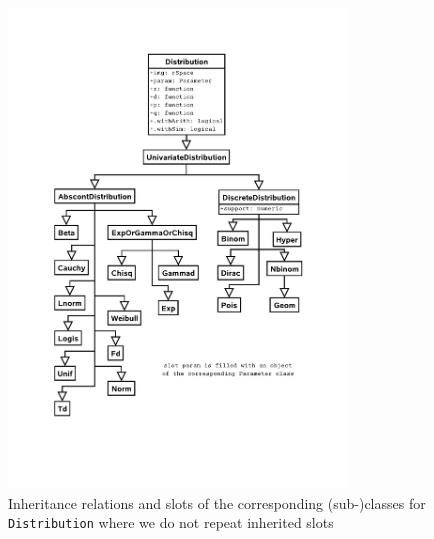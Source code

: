 \documentclass[11pt]{article}
\newcommand{\code}[1]{{\tt #1}}
\begin{document}
\ifpdf
\begin{figure}[!ht]\label{fig1}
\vspace{2ex}
  \begin{center}
    \includegraphics[viewport=130 150 500 750,width=9cm]{distribution.pdf}%
    \caption{\label{fig1c}{\footnotesize Inheritance relations and slots of the
    corresponding \mbox{(sub-)}classes for \code{Distribution} where we do not
    repeat inherited slots
    }}
  \end{center}
\vspace{-4ex}
\end{figure}
\else
\end{document}
